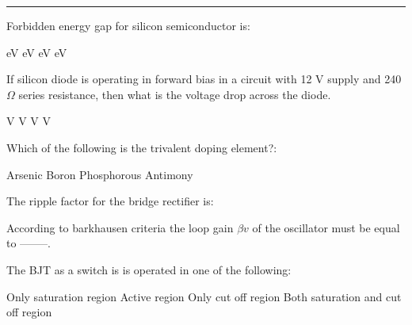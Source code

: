 \documentclass[legalpaper, 12pt, addpoints]{exam}
\begin{document}
\vspace{0.1in}
\hrule 
\vspace{0.1in}
\begin{questions}
\question Forbidden energy gap for silicon semiconductor is:\\[0.3cm]
\begin{oneparchoices}
 eV
 eV
 eV
 eV
\end{oneparchoices} 
\question If silicon diode is operating in forward bias in a circuit with 12 V supply and 240 $\Omega$ series resistance, then what is the voltage drop across the diode. \\[0.3cm]
\begin{oneparchoices}
 V
 V
 V
 V
\end{oneparchoices}  
\question Which of the following is the trivalent doping element?:\\[0.3cm]
\begin{oneparchoices}
\choice Arsenic
\choice Boron
\choice Phosphorous
\choice Antimony
\end{oneparchoices}  
\question The ripple factor for the bridge rectifier is:\\[0.3cm]
\begin{oneparchoices}
\end{oneparchoices}  
\question According to barkhausen criteria the loop gain $\beta v$ of the oscillator must be equal to --------.\\[0.3cm]
\begin{oneparchoices}
\end{oneparchoices} 
\question The BJT as a switch is is operated in one of the following:
\begin{oneparchoices}
\choice Only saturation region
\choice Active region
\choice Only cut off region
\choice Both saturation and cut off region
\end{oneparchoices}  


\end{questions}
\end{document}
